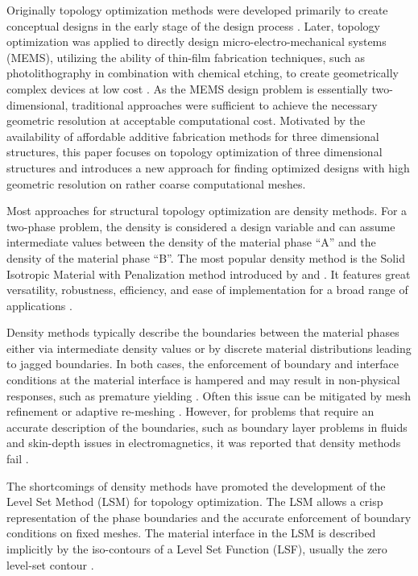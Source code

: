 Originally topology optimization methods were developed primarily to create conceptual designs in the early stage of the design process \citep{BS:03,Rozvany:09}. Later, topology optimization was applied to directly design micro-electro-mechanical systems (MEMS), utilizing the ability of thin-film fabrication techniques, such as photolithography in combination with chemical etching, to create geometrically complex devices at low cost \citep{Sigmund:01,Sigmund:01a}. As the MEMS design problem is essentially two-dimensional, traditional approaches were sufficient to achieve the necessary geometric resolution at acceptable computational cost. Motivated by the availability of affordable additive fabrication methods for three dimensional structures, this paper focuses on topology optimization of three dimensional structures and introduces a new approach for finding optimized designs with high geometric resolution on rather coarse computational meshes.      

Most approaches for structural topology optimization are density methods. For a two-phase problem, the density is considered a design variable and can assume intermediate values between the density of the material phase ``A'' and the density of the material phase ``B''. The most popular density method is the Solid Isotropic Material with Penalization method introduced by \citet{Bendsoe:89} and \citet{ZR:91}. It features great versatility, robustness, efficiency, and ease of implementation for a broad range of applications \citep{SM:13,DG:13}.

Density methods typically describe the boundaries between the material phases either via intermediate density values or by discrete material distributions leading to jagged boundaries. In both cases, the enforcement of boundary and interface conditions at the material interface is hampered and may result in non-physical responses, such as premature yielding \citep{MSR:98}. Often this issue can be mitigated by mesh refinement or adaptive re-meshing \citep{MR:95,MR:97}. However, for problems that require an accurate description of the boundaries, such as boundary layer problems in fluids and skin-depth issues in electromagnetics, it was reported that density methods fail \citep{SM:13}.

The shortcomings of density methods have promoted the development of the Level Set Method (LSM) for topology optimization. The LSM allows a crisp representation of the phase boundaries and the accurate enforcement of boundary conditions on fixed meshes. The material interface in the LSM is described implicitly by the iso-contours of a Level Set Function (LSF), usually the zero level-set contour \citep{AJT:04,SW:00,WWG:03}.


